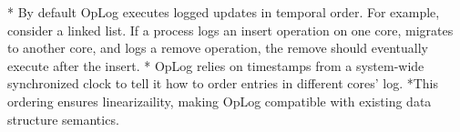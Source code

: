 
* By default OpLog executes logged updates in temporal order. For example,
consider a linked list. If a process logs an insert operation on one core,
migrates to another core, and logs a remove operation, the remove should
eventually execute after the insert.
* OpLog relies on timestamps from a system-wide synchronized clock to tell it
how to order entries in different cores' log.
*This ordering ensures linearizaility, making OpLog compatible with existing
data structure semantics.











